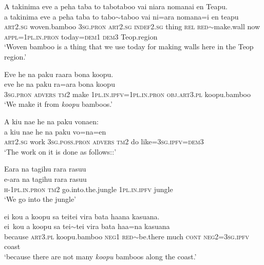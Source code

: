 \ea\label{ex:text14-1}
A takinima eve a peha taba to tabotaboo vai niara nomanai en Teapu.\\
\gll a	takinima	eve	a	peha	taba	to	tabo{$\sim$}taboo	vai	ni=ara	nomana=i	en	teapu\\
     \textsc{art}2.\textsc{sg}	woven.bamboo	3\textsc{sg}.\textsc{pron}	\textsc{art}2.\textsc{sg}	\textsc{indef}2.\textsc{sg}	thing	\textsc{rel}	\textsc{red}{$\sim$}make.wall	now	\textsc{appl}=1\textsc{pl}.\textsc{in}.\textsc{pron}	today=\textsc{dem}1	\textsc{dem}3	Teop.region\\
\glt `Woven bamboo is a thing that we use today for making walls here in the Teop region.'
\z

\ea\label{ex:text14-2}
Eve he na paku raara bona koopu.\\
\gll eve	he	na	paku	ra=ara	bona	koopu\\
     3\textsc{sg}.\textsc{pron}	\textsc{advers}	\textsc{tm}2	make	1\textsc{pl}.\textsc{in}.\textsc{ipfv}=1\textsc{pl}.\textsc{in}.\textsc{pron}	\textsc{obj}.\textsc{art}3.\textsc{pl}	koopu.bamboo\\
\glt `We make it from \textit{koopu} bamboos.'
\z

\ea\label{ex:text14-3}
A kiu nae he na paku vonaen:\\
\gll a	kiu	nae	he	na	paku	vo=na=en\\
     \textsc{art}2.\textsc{sg}	work	3\textsc{sg}.\textsc{poss}.\textsc{pron}	\textsc{advers}	\textsc{tm}2	do	like=3\textsc{sg}.\textsc{ipfv}=\textsc{dem}3\\
\glt `The work on it is done as follows::'
\z

\ea\label{ex:text14-4}
Eara na tagihu rara rasuu\\
\gll e-ara	na	tagihu	rara	rasuu\\
     \textsc{h}-1\textsc{pl}.\textsc{in}.\textsc{pron}	\textsc{tm}2	go.into.the.jungle	1\textsc{pl}.\textsc{in}.\textsc{ipfv}	jungle\\
\glt `We go into the jungle'
\z

\ea\label{ex:text14-5}
ei kou a koopu sa teitei vira bata haana kasuana.\\
\gll ei~kou	a	koopu	sa	tei{$\sim$}tei	vira	bata	haa=na	kasuana\\
     because	\textsc{art}3.\textsc{pl}	koopu.bamboo	\textsc{neg}1	\textsc{red}{$\sim$}be.there	much	\textsc{cont}	\textsc{neg}2=3\textsc{sg}.\textsc{ipfv}	coast\\
\glt `because there are not many \textit{koopu} bamboos along the coast.'
\z

